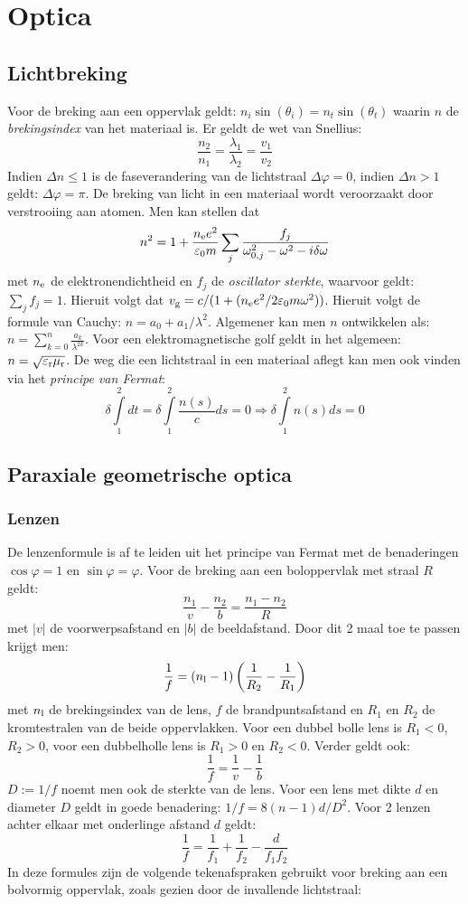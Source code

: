 \documentclass[twoside]{report}
\begin{document}
\chapter{Optica}
\section{Lichtbreking}
Voor de breking aan een oppervlak geldt: $n_i\sin(\theta_i)=n_t\sin(\theta_t)$
waarin $n$ de {\it brekingsindex} van het materiaal is. Er geldt de wet van
Snellius:
\[
\frac{n_2}{n_1}=\frac{\lambda_1}{\lambda_2}=\frac{v_1}{v_2}
\]
Indien $\Delta n\leq1$ is de faseverandering van de lichtstraal
$\Delta\varphi=0$, indien $\Delta n>1$ geldt: $\Delta\varphi=\pi$. De
breking van licht in een materiaal wordt veroorzaakt door verstrooiing
aan atomen. Men kan stellen dat
\[
n^2=1+\frac{n_{\rm e}e^2}{\varepsilon_0m}\sum_j\frac{f_j}{\omega_{0,j}^2-\omega^2-i\delta\omega}
\]
met $n_{\rm e}$ de elektronendichtheid en $f_j$ de {\it oscillator sterkte},
waarvoor geldt: $\sum\limits_j f_j=1$.
Hieruit volgt dat $v_{\rm g}=c/(1+(n_{\rm e}e^2/2\varepsilon_0m\omega^2))$.
Hieruit volgt de formule van Cauchy: $n=a_0+a_1/\lambda^2$. Algemener kan men
$n$ ontwikkelen als: $\displaystyle n=\sum_{k=0}^n\frac{a_k}{\lambda^{2k}}$.
\npar
Voor een elektromagnetische golf geldt in het algemeen:
$n=\sqrt{\varepsilon_{\rm r}\mu_{\rm r}}$.
\npar
De weg die een lichtstraal in een materiaal aflegt kan men ook vinden via
het {\it principe van Fermat}:
\[
\delta\int\limits_1^2 dt=\delta\int\limits_1^2\frac{n(s)}{c}ds=0\Rightarrow
\delta\int\limits_1^2 n(s)ds=0
\]

\section{Paraxiale geometrische optica}
\subsection{Lenzen}
De lenzenformule is af te leiden uit het principe van Fermat met de
benaderingen $\cos\varphi=1$ en $\sin\varphi=\varphi$. Voor de breking aan
een boloppervlak met straal $R$ geldt:
\[
\frac{n_1}{v}-\frac{n_2}{b}=\frac{n_1-n_2}{R}
\]
met $|v|$ de voorwerpsafstand en $|b|$ de beeldafstand. Door dit 2 maal toe
te passen krijgt men:
\[
\frac{1}{f}=(n_{\rm l}-1)\left(\frac{1}{R_2}-\frac{1}{R_1}\right)
\]
met $n_{\rm l}$ de brekingsindex van de lens, $f$ de brandpuntsafstand en
$R_1$ en $R_2$ de kromtestralen van de beide oppervlakken. Voor een dubbel
bolle lens is $R_1<0$, $R_2>0$, voor een dubbelholle lens is $R_1>0$ en
$R_2<0$. Verder geldt ook:
\[
\frac{1}{f}=\frac{1}{v}-\frac{1}{b}
\]
$D:=1/f$ noemt men ook de sterkte van de lens. Voor een lens met dikte $d$ en
diameter $D$ geldt in goede benadering: $1/f=8(n-1)d/D^2$. Voor 2 lenzen
achter elkaar met onderlinge afstand $d$ geldt:
\[
\frac{1}{f}=\frac{1}{f_1}+\frac{1}{f_2}-\frac{d}{f_1f_2}
\]
In deze formules zijn de volgende tekenafspraken gebruikt voor breking aan
een bolvormig oppervlak, zoals gezien door de invallende lichtstraal:
\end{document}
